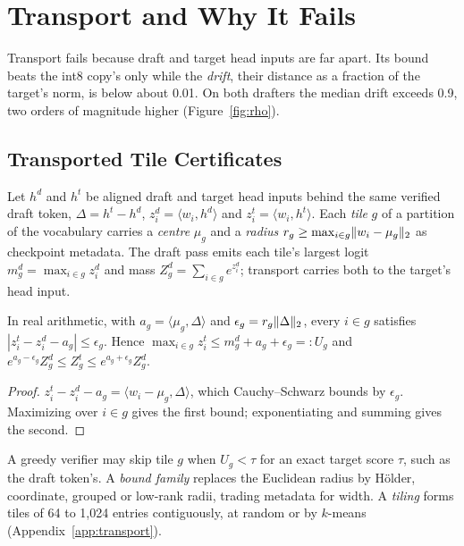 \section{Transport and Why It Fails}\label{sec:transport}
Transport fails because draft and target head inputs are far apart. Its bound beats the int8 copy's only while the \emph{drift}, their distance as a fraction of the target's norm, is below about 0.01. On both drafters the median drift exceeds 0.9, two orders of magnitude higher (Figure~\ref{fig:rho}).

\subsection{Transported Tile Certificates}\label{sec:transport-def}
Let $h^d$ and $h^t$ be aligned draft and target head inputs behind the same verified draft token, $\Delta=h^t-h^d$, $z^d_i=\langle w_i,h^d\rangle$ and $z^t_i=\langle w_i,h^t\rangle$. Each \emph{tile} $g$ of a partition of the vocabulary carries a \emph{centre} $\mu_g$ and a \emph{radius} $r_g\ge\max_{i\in g}\lVert w_i-\mu_g\rVert_2$ as checkpoint metadata. The draft pass emits each tile's largest logit $m^d_g=\max_{i\in g}z^d_i$ and mass $Z^d_g=\sum_{i\in g}e^{z^d_i}$; transport carries both to the target's head input.

\begin{theorem}\label{thm:transport}
In real arithmetic, with $a_g=\langle\mu_g,\Delta\rangle$ and $\epsilon_g=r_g\lVert \Delta\rVert_2$, every $i\in g$ satisfies $|z^t_i-z^d_i-a_g|\le\epsilon_g$. Hence $\max_{i\in g}z^t_i\le m^d_g+a_g+\epsilon_g=:U_g$ and $e^{a_g-\epsilon_g}Z^d_g\le Z^t_g\le e^{a_g+\epsilon_g}Z^d_g$.
\end{theorem}
\begin{proof}
$z^t_i-z^d_i-a_g=\langle w_i-\mu_g,\Delta\rangle$, which Cauchy--Schwarz bounds by $\epsilon_g$. Maximizing over $i\in g$ gives the first bound; exponentiating and summing gives the second.
\end{proof}
A greedy verifier may skip tile $g$ when $U_g<\tau$ for an exact target score $\tau$, such as the draft token's. A \emph{bound family} replaces the Euclidean radius by Hölder, coordinate, grouped or low-rank radii, trading metadata for width. A \emph{tiling} forms tiles of 64 to 1,024 entries contiguously, at random or by $k$-means (Appendix~\ref{app:transport}).

